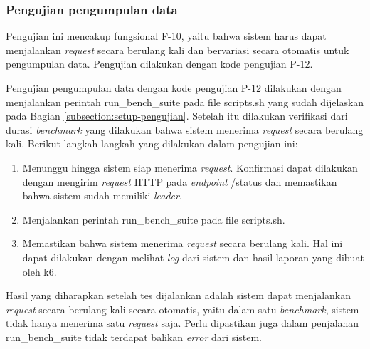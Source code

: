 \subsubsection{Pengujian pengumpulan data}
\label{subsubsection:pengujian-pengumpulan-data}

Pengujian ini mencakup fungsional F-10, yaitu bahwa sistem harus dapat menjalankan \textit{request} secara berulang kali dan bervariasi secara otomatis untuk pengumpulan data. Pengujian dilakukan dengan kode pengujian P-12.

Pengujian pengumpulan data dengan kode pengujian P-12 dilakukan dengan menjalankan perintah run\_bench\_suite pada file scripts.sh yang sudah dijelaskan pada Bagian \ref{subsection:setup-pengujian}. Setelah itu dilakukan verifikasi dari durasi \textit{benchmark} yang dilakukan bahwa sistem menerima \textit{request} secara berulang kali. Berikut langkah-langkah yang dilakukan dalam pengujian ini:

\begin{enumerate}
	\item Menunggu hingga sistem siap menerima \textit{request}. Konfirmasi dapat dilakukan dengan mengirim \textit{request} HTTP pada \textit{endpoint} /status dan memastikan bahwa sistem sudah memiliki \textit{leader}.
	\item Menjalankan perintah run\_bench\_suite pada file scripts.sh.
	\item Memastikan bahwa sistem menerima \textit{request} secara berulang kali. Hal ini dapat dilakukan dengan melihat \textit{log} dari sistem dan hasil laporan yang dibuat oleh k6.
\end{enumerate}

Hasil yang diharapkan setelah tes dijalankan adalah sistem dapat menjalankan \textit{request} secara berulang kali secara otomatis, yaitu dalam satu \textit{benchmark}, sistem tidak hanya menerima satu \textit{request} saja. Perlu dipastikan juga dalam penjalanan run\_bench\_suite tidak terdapat balikan \textit{error} dari sistem.